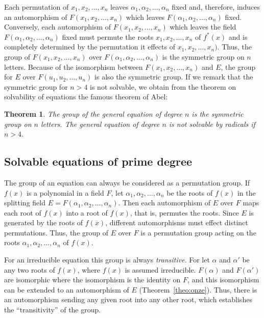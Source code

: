 \documentclass[10pt,leqno]{article}
\newtheorem{theo}{Theorem}
\theoremstyle{definition}
\begin{document}
Each permutation of $x_1,x_2,\ldots,x_n$ leaves $\alpha_1,\alpha_2,\ldots,\alpha_n$ fixed and, therefore, induces an automorphism of $F(x_1,x_2,\ldots,x_n)$ which leaves $F(\alpha_1,\alpha_2,\ldots,\alpha_n)$ fixed.
Conversely, each automorphism of $F(x_1,x_2,\ldots,x_n)$ which leaves the field $F(\alpha_1,\alpha_2,\ldots,\alpha_n)$ fixed must permute the roots $x_1,x_2,\ldots,x_n$ of $f^*(x)$ and is completely determined by the permutation it effects of $x_1,x_2,\ldots,x_n)$.
Thus, the group of $F(x_1,x_2,\ldots,x_n)$ over $F(\alpha_1,\alpha_2,\ldots,\alpha_n)$ is the symmetric group on $n$ letters.
Because of the isomorphism between $F(x_1,x_2,\ldots,x_n)$ and $E$, the group for $E$ over $F(u_1,u_2,\ldots,u_n)$ is also the symmetric group.
If we remark that the symmetric group for $n > 4$ is not solvable, we obtain from the theorem on solvability of equations the famous theorem of Abel:

\begin{theo}
\label{theo:III.6}
The group of the general equation of degree $n$ is the symmetric group on $n$ letters.
The general equation of degree $n$ is not solvable by radicals if $n > 4$.
\end{theo}


\subsection{Solvable equations of prime degree}

\setcounter{coro}{0}

The group of an equation can always be considered as a permutation group.
If $f(x)$ is a polynomial in a field $F$, let $\alpha_1, \alpha_2, \ldots, \alpha_n$ be the roots of $f(x)$ in the splitting field $E = F(\alpha_1, \alpha_2, \ldots, \alpha_n)$.
Then each automorphism of $E$ over $F$ maps each root of $f(x)$ into a root of $f(x)$, that is, permutes the roots.
Since $E$ is generated by the roots of $f(x)$, different automorphisms must effect distinct permutations.
Thus, the group of $E$ over $F$ is a permutation group acting on the roots $\alpha_1, \alpha_2, \ldots, \alpha_n$ of $f(x)$.

For an irreducible equation this group is always \emph{transitive}.
For let $\alpha$ and $\alpha'$ be any two roots of $f(x)$, where $f(x)$ is assumed irreducible.
$F(\alpha)$ and $F(\alpha')$ are isomorphic where the isomorphism is the identity on $F$, and this isomorphism can be extended to an automorphism of $E$ (Theorem~\ref{theo:onze}).
Thus, there is an automorphism sending any given root into any other root, which establishes the ``transitivity'' of the group.
\end{document}
